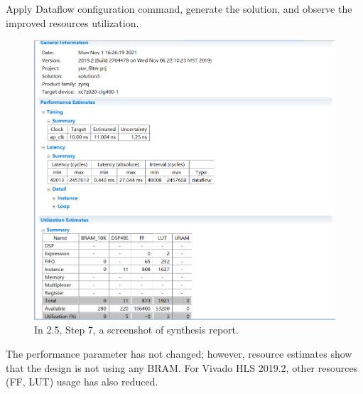 \documentclass[a4paper]{article}
\begin{document}
Apply Dataflow configuration command, generate the solution, and observe the improved resources utilization.

\begin{figure}[H]
    \centering
    \includegraphics[width=1\textwidth]{6.png}
    \caption{In 2.5, Step 7, a screenshot of synthesis report.}
\end{figure}
The performance parameter has not changed; however, resource estimates show that the design is not using any BRAM. For Vivado HLS 2019.2, other resources (FF, LUT) usage has also reduced.
\end{document}
